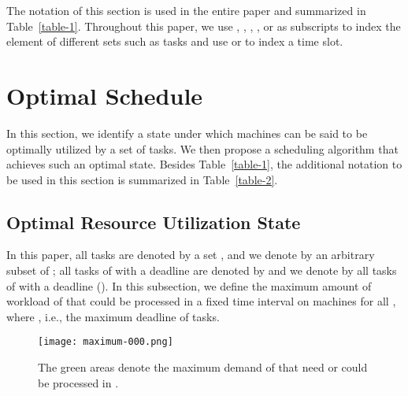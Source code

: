 \documentclass[10pt,journal,compsoc]{IEEEtran}
\begin{document}
The notation of this section is used in the entire paper and summarized in Table~\ref{table-1}. Throughout this paper, we use , , , , or  as subscripts to index the element of different sets such as tasks and use  or  to index a time slot.



\section{Optimal Schedule}
\label{sec.optimal}

In this section, we identify a state under which  machines can be said to be optimally utilized by a set of tasks. We then propose a scheduling algorithm that achieves such an optimal state. Besides Table~\ref{table-1}, the additional notation to be used in this section is summarized in Table~\ref{table-2}. 







\subsection{Optimal Resource Utilization State}
\label{sec.optimal-utilization}


In this paper, all tasks are denoted by a set , and we denote by  an arbitrary subset of ; all tasks of  with a deadline  are denoted by  and we denote by  all tasks of  with a deadline  (). In this subsection, we define the maximum amount of workload of  that could be processed in a fixed time interval  on  machines for all , where , i.e., the maximum deadline of tasks.















\begin{figure}[!ht]\centering

\texttt{[image: maximum-000.png]}

  \caption{The green areas denote the maximum demand of  that need or could be processed in .}\label{Fig.1}
\end{figure}
\end{document}
